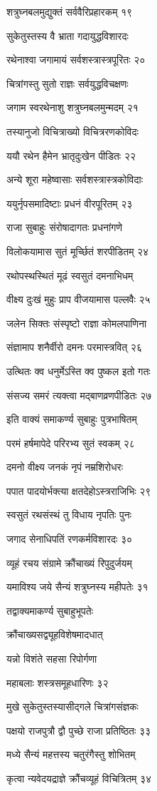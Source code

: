 शत्रुघ्नबलमुद्युक्तं सर्ववैरिप्रहारकम् १९

सुकेतुस्तस्य वै भ्राता गदायुद्धविशारदः

रथेनाश्वा जगामायं सर्वशस्त्रास्त्रपूरितः २०

चित्रांगस्तु सुतो राज्ञः सर्वयुद्धविचक्षणः

जगाम स्वरथेनाशु शत्रुघ्नबलमुन्मदम् २१

तस्यानुजो विचित्राख्यो विचित्ररणकोविदः

ययौ रथेन हैमेन भ्रातृदुःखेन पीडितः २२

अन्ये शूरा महेष्वासाः सर्वशस्त्रास्त्रकोविदाः

ययुर्नृपसमादिष्टाः प्रधनं वीरपूरितम् २३

राजा सुबाहुः संरोषादागतः प्रधनांगणे

विलोकयामास सुतं मूर्च्छितं शरपीडितम् २४

रथोपस्थस्थितं मूढं स्वसुतं दमनाभिधम्

वीक्ष्य दुःखं मुहुः प्राप वीजयामास पल्लवैः २५

जलेन सिक्तः संस्पृष्टो राज्ञा कोमलपाणिना

संज्ञामाप शनैर्वीरो दमनः परमास्त्रवित् २६

उत्थितः क्व धनुर्मेऽस्ति क्व पुष्कल इतो गतः

संसज्य समरं त्यक्त्वा मद्बाणव्रणपीडितः २७

इति वाक्यं समाकर्ण्य सुबाहुः पुत्रभाषितम्

परमं हर्षमापेदे परिरभ्य सुतं स्वकम् २८

दमनो वीक्ष्य जनकं नृपं नम्रशिरोधरः

पपात पादयोर्भक्त्या क्षतदेहोऽस्त्रराजिभिः २९

स्वसुतं रथसंस्थं तु विधाय नृपतिः पुनः

जगाद सेनाधिपतिं रणकर्मविशारदः ३०

व्यूहं रचय संग्रामे क्रौंचाख्यं रिपुदुर्जयम्

यमाविश्य जये सैन्यं शत्रुघ्नस्य महीपतेः ३१

तद्वाक्यमाकर्ण्य सुबाहुभूपतेः

क्रौंचाख्यसद्व्यूहविशेषमादधात्

यन्नो विशंते सहसा रिपोर्गणा

महाबलाः शस्त्रसमूहधारिणः ३२

मुखे सुकेतुस्तस्यासीद्गले चित्रांगसंज्ञकः

पक्षयो राजपुत्रौ द्वौ पुच्छे राजा प्रतिष्ठितः ३३

मध्ये सैन्यं महत्तस्य चतुरंगैस्तु शोभितम्

कृत्वा न्यवेदयद्राज्ञे क्रौंचव्यूहं विचित्रितम् ३४

